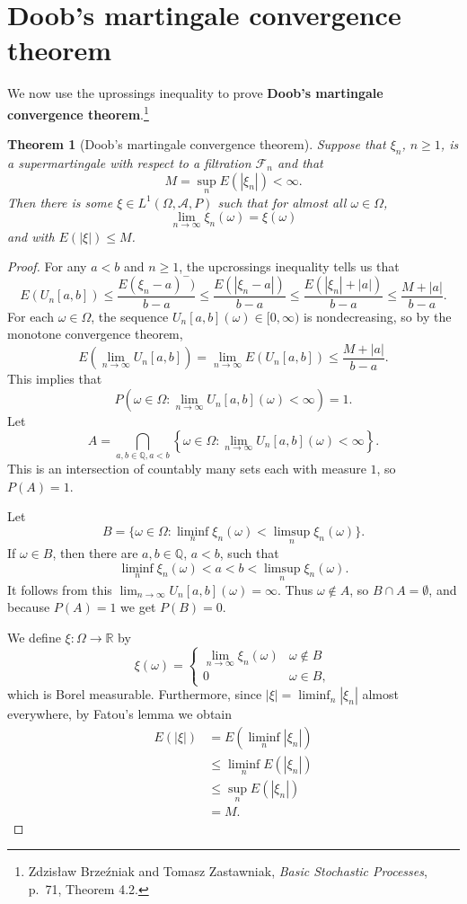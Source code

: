 \documentclass{article}
\newtheorem{theorem}{Theorem}
\theoremstyle{definition}
\begin{document}
\section{Doob's martingale convergence theorem}
We now use the uprossings inequality to prove \textbf{Doob's martingale convergence theorem}.\footnote{Zdzis\l{}aw Brze\'zniak and Tomasz Zastawniak, {\em Basic Stochastic Processes},
p.~71, Theorem 4.2.}

\begin{theorem}[Doob's martingale convergence theorem]
Suppose that $\xi_n$, $n \geq 1$, is a supermartingale with respect to a filtration $\mathscr{F}_n$ and that
\[
M=\sup_n E(|\xi_n|)<\infty.
\]
Then there is some $\xi \in L^1(\Omega,\mathscr{A},P)$ such that for almost all $\omega \in \Omega$,
\[
\lim_{n \to \infty} \xi_n(\omega) = \xi(\omega)
\]
and with $E(|\xi|) \leq M$. 
\end{theorem}
\begin{proof}
For any $a<b$ and $n \geq 1$, the upcrossings inequality tells us that
\[
E(U_n[a,b]) \leq \frac{E(\xi_n-a)^-)}{b-a} \leq 
\frac{E(|\xi_n-a|)}{b-a} \leq
\frac{E(|\xi_n|+|a|)}{b-a} \leq \frac{M+|a|}{b-a}.
\] 
For each $\omega \in \Omega$, the sequence $U_n[a,b](\omega) \in [0,\infty)$ is nondecreasing, so by the monotone
convergence theorem,
\[
E\left(\lim_{n \to \infty} U_n[a,b] \right) = \lim_{n \to \infty} E(U_n[a,b]) \leq \frac{M+|a|}{b-a}.
\]
This implies that
\[
P\left(\omega \in \Omega: \lim_{n \to \infty} U_n[a,b](\omega) <\infty\right)=1.
\]
Let 
\[
A= \bigcap_{a,b \in \mathbb{Q}, a<b} \left\{\omega \in \Omega:
\lim_{n \to \infty} U_n[a,b](\omega)<\infty\right\}.
\]
This is an intersection of countably many sets each with measure $1$, so $P(A)=1$.

Let
\[
B = \{\omega \in \Omega: \liminf_n \xi_n(\omega) < \limsup_n \xi_n(\omega)\}.
\]
If $\omega \in B$, then there are $a,b \in \mathbb{Q}$, $a<b$, such that
\[
\liminf_n \xi_n(\omega)<a<b<\limsup_n \xi_n(\omega).
\]
It follows from this $\lim_{n \to \infty} U_n[a,b](\omega)=\infty$. Thus $\omega \not \in A$, so
$B \cap A = \emptyset$, and because $P(A)=1$ we get $P(B)=0$. 

We define $\xi:\Omega \to \mathbb{R}$ by
\[
\xi(\omega)=\begin{cases}
\lim_{n \to \infty} \xi_n(\omega)&\omega \not \in B\\
0&\omega \in B,
\end{cases}
\]
which is Borel measurable. Furthermore, since $|\xi|=\liminf_n |\xi_n|$ almost everywhere,
by Fatou's lemma we obtain
\begin{align*}
E(|\xi|)&=E(\liminf_n |\xi_n|)\\
&\leq \liminf_n E(|\xi_n|)\\
&\leq \sup_n E(|\xi_n|)\\
&=M.
\end{align*}
\end{proof}
\end{document}
